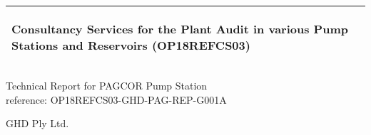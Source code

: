 %
\begin{titlepage}
  \addtolength{\hoffset}{0.5\evensidemargin-0.5\oddsidemargin} %
  \noindent%
  \begin{tabular}{@{}p{\textwidth}@{}}
    \toprule[2pt]
    \midrule
    \vspace{0.2cm}
    \begin{center}
    \Huge{\textbf{
      Consultancy Services for the Plant Audit in various Pump Stations and Reservoirs (OP18REFCS03) %
    }}
    \end{center}
    \begin{center}
      \Large{
      }
    \end{center}
    \vspace{0.2cm}\\
    \midrule
    \toprule[2pt]
  \end{tabular}
  \vspace{4 cm}
  \begin{center}
    {\large
      Technical Report for PAGCOR Pump Station%
    }\\
    \vspace{0.2cm}
    {\Large
      reference: OP18REFCS03-GHD-PAG-REP-G001A%
    }
  \end{center}
  \vfill
  \begin{center}
  GHD Ply Ltd.\\
  \end{center}
\end{titlepage}
\clearpage